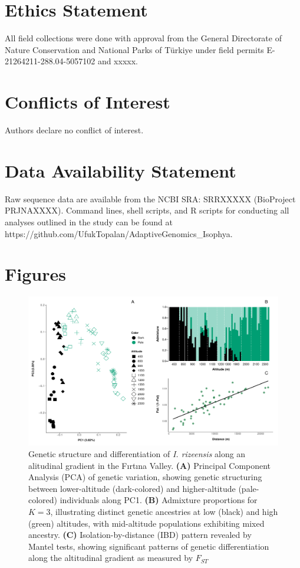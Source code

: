 \documentclass[9pt,a4paper,twoside]{rho-class/rho}
\begin{document}
\section{Ethics Statement}
All field collections were done with approval from the General Directorate of Nature Conservation and National Parks of Türkiye under field permits E-21264211-288.04-5057102 and xxxxx.

\section{Conflicts of Interest}
Authors declare no conflict of interest.

\section{Data Availability Statement}
Raw sequence data are available from the NCBI SRA: SRRXXXXX (BioProject PRJNAXXXX). Command lines, shell scripts, and R scripts for conducting all analyses outlined in the study can be found at https://github.com/UfukTopalan/AdaptiveGenomics\_Isophya.

\printbibliography
\clearpage\section{Figures}
\begin{figure}[h]
\centering
\includegraphics[width=1.8\columnwidth]{Figure_2.pdf}
\caption{Genetic structure and differentiation of \textit{I. rizeensis} along an alitudinal gradient in the Fırtına Valley. \textbf{(A)} Principal Component Analysis (PCA) of genetic variation, showing genetic structuring between lower-altitude (dark-colored) and higher-altitude (pale-colored) individuals along PC1. \textbf{(B)} Admixture proportions for $K=3$, illustrating distinct genetic ancestries at low (black) and high (green) altitudes, with mid-altitude populations exhibiting mixed ancestry. \textbf{(C)} Isolation-by-distance (IBD) pattern revealed by Mantel tests, showing significant patterns of genetic differentiation along the altitudinal gradient as measured by $F_{ST}$}
\label{Figure 2}
\end{figure}
\end{document}

